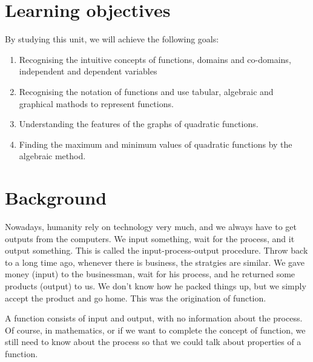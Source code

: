 \documentclass[12pt]{article}
\begin{document}
    \section*{Learning objectives}
    By studying this unit, we will achieve the following goals:
    \begin{enumerate}
        \item Recognising the intuitive concepts of functions, domains and co-domains, independent and dependent variables
        \item Recognising the notation of functions and use tabular, algebraic and graphical mathods to represent functions.
        \item Understanding the features of the graphs of quadratic functions.
        \item Finding the maximum and minimum values of quadratic functions by the algebraic method.
    \end{enumerate}

    \section*{Background}
    Nowadays, humanity rely on technology very much, and we always have to get outputs from the computers. We input something, wait for the process, and it output something. This  is called the input-process-output procedure. Throw back to a long time ago, whenever there is business, the stratgies are similar. We gave money (input) to the businessman, wait for his process, and he returned some products (output) to us. We don't know how he packed things up, but we simply accept the product and go home. This was the origination of function.

    A function consists of input and output, with no information about the process. Of course, in mathematics, or if we want to complete the concept of function, we still need to know about the process so that we could talk about properties of a function.
\end{document}
